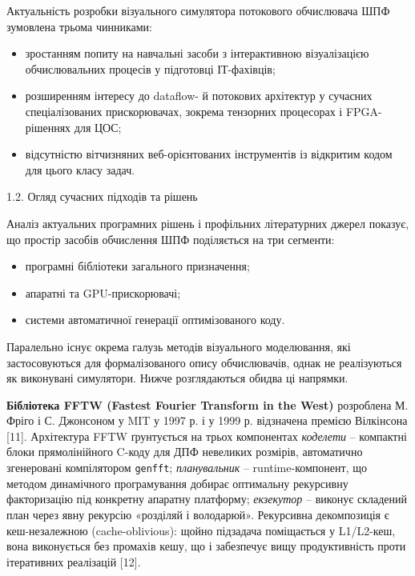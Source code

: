 \documentclass[
]{article}
\newcommand{\passthrough}[1]{#1}
\begin{document}
Актуальність розробки візуального симулятора потокового обчислювача ШПФ
зумовлена трьома чинниками:

\begin{itemize}
\item
  зростанням попиту на навчальні засоби з інтерактивною візуалізацією
  обчислювальних процесів у підготовці ІТ-фахівців;
\item
  розширенням інтересу до dataflow- й потокових архітектур у сучасних
  спеціалізованих прискорювачах, зокрема тензорних процесорах і
  FPGA-рішеннях для ЦОС;
\item
  відсутністю вітчизняних веб-орієнтованих інструментів із відкритим
  кодом для цього класу задач.
\end{itemize}

\protect{}\label{X92b031453c6d8ed53c9049f3de12fcc4c3dd5ef}{}1.2.
Огляд сучасних підходів та рішень

Аналіз актуальних програмних рішень і профільних літературних джерел
показує, що простір засобів обчислення ШПФ поділяється на три сегменти:

\begin{itemize}
\item
  програмні бібліотеки загального призначення;
\item
  апаратні та GPU-прискорювачі;
\item
  системи автоматичної генерації оптимізованого коду.
\end{itemize}

Паралельно існує окрема галузь методів візуального моделювання, які
застосовуються для формалізованого опису обчислювачів, однак не
реалізуються як виконувані симулятори. Нижче розглядаються обидва ці
напрямки.

\textbf{Бібліотека FFTW (Fastest Fourier Transform in the West)}
розроблена М. Фріго і С. Джонсоном у MIT у 1997 р. і у 1999 р.
відзначена премією Вілкінсона {[}11{]}. Архітектура FFTW ґрунтується на
трьох компонентах \emph{коделети} -- компактні блоки прямолінійного
C-коду для ДПФ невеликих розмірів, автоматично згенеровані компілятором
\passthrough{\lstinline!genfft!}; \emph{планувальник} --
runtime-компонент, що методом динамічного програмування добирає
оптимальну рекурсивну факторизацію під конкретну апаратну платформу;
\emph{екзекутор} -- виконує складений план через явну рекурсію «розділяй
і володарюй». Рекурсивна декомпозиція є кеш-незалежною
(cache-oblivious): щойно підзадача поміщається у L1/L2-кеш, вона
виконується без промахів кешу, що і забезпечує вищу продуктивність проти
ітеративних реалізацій {[}12{]}.
\end{document}
